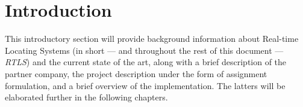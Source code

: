 \chapter{Introduction}

This introductory section will provide background information about Real-time Locating Systems (in short --- and throughout the rest of this document --- \emph{RTLS}) and the current state of the art, along with a brief description of the partner company, the project description under the form of assignment formulation, and a brief overview of the implementation.
The latters will be elaborated further in the following chapters.








